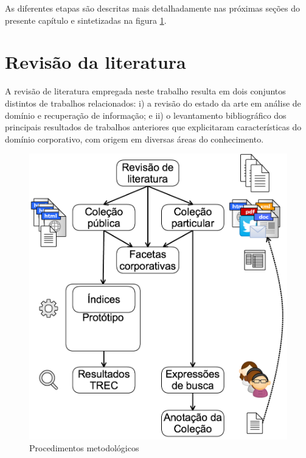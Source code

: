 As diferentes etapas são descritas mais detalhadamente nas próximas seções do presente capítulo e sintetizadas na figura \ref{fig:metodologia}. %


\section{Revisão da literatura}

A revisão de literatura empregada neste trabalho resulta em dois conjuntos distintos de trabalhos relacionados: i) a revisão do estado da arte em análise de domínio e recuperação de informação; e ii) o levantamento bibliográfico dos principais resultados de trabalhos anteriores que explicitaram características do domínio corporativo, com origem em diversas áreas do conhecimento.%

\begin{figure}
	\caption{\label{fig:metodologia}Procedimentos metodológicos}

	\centering
		\includegraphics[width=.80\textwidth]{fig/metodologia.jpg}

\end{figure}

